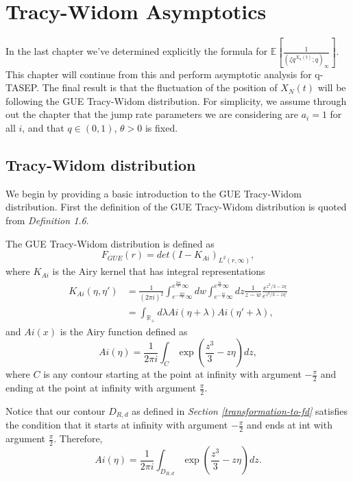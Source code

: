 \chapter{Tracy-Widom Asymptotics}
In the last chapter we've determined explicitly the formula for $\mathbb{E}\left[ \frac{1}{(\zeta q^{X_n(t)}; q)_{\infty}} \right]$. This chapter will continue from this and perform asymptotic analysis for q-TASEP. The final result is that the fluctuation of the position of $X_N(t)$ will be following the GUE Tracy-Widom distribution. For simplicity, we assume through out the chapter that the jump rate parameters we are considering are $a_i = 1$ for all $i$, and that $q \in (0,1)$, $\theta > 0$ is fixed. 

\section{Tracy-Widom distribution}
We begin by providing a basic introduction to the GUE Tracy-Widom distribution. First the definition of the GUE Tracy-Widom distribution is quoted from \cite{tracy-widom-def} \textit{Definition 1.6}.

\begin{definition}
The GUE Tracy-Widom distribution is defined as $$F_{GUE}(r) = det(I-K_{Ai})_{L^2(r, \infty)},$$ where $K_{Ai}$ is the Airy kernel that has integral representations 
\begin{align*}
K_{Ai}(\eta, \eta') &= \frac{1}{(2 \pi i)^2} \int_{e^{-\frac{2 \pi i}{3}} \infty}^{e^{\frac{2 \pi i}{3}} \infty} dw \int_{e^{-\frac{\pi i}{3}} \infty}^{e^{\frac{\pi i}{3}} \infty} dz \frac{1}{z-w} \frac{e^{z^3 / 3 - z \eta}}{e^{z^3 / 3 - z \eta'}}\\
&= \int_{\mathbb{R}_+} d \lambda Ai(\eta + \lambda) Ai(\eta' + \lambda),
\end{align*}
and $Ai(x)$ is the Airy function defined as
$$Ai(\eta) = \frac{1}{2 \pi i} \int_{C} \exp (\frac{z^3}{3} - z \eta) dz,$$ where $C$ is any contour starting at the point at infinity with argument $-\frac{\pi}{2}$ and ending at the point at infinity with argument $\frac{\pi}{2}$.
\end{definition}
Notice that our contour $D_{R,d}$ as defined in \textit{Section \ref{transformation-to-fd}} satisfies the condition that it starts at infinity with argument $-\frac{\pi}{2}$ and ends at int with argument $\frac{\pi}{2}$. Therefore, $$Ai(\eta) = \frac{1}{2 \pi i} \int_{D_{R,d}} \exp (\frac{z^3}{3} - z \eta) dz.$$

